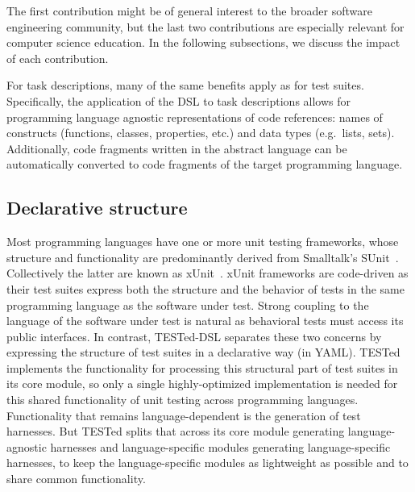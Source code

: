 \documentclass[../main]{subfiles}
\begin{document}
The first contribution might be of general interest to the broader software engineering community, but the last two contributions are especially relevant for computer science education.
In the following subsections, we discuss the impact of each contribution.

For task descriptions, many of the same benefits apply as for test suites.
Specifically, the application of the DSL to task descriptions allows for programming language agnostic representations of code references: names of constructs (functions, classes, properties, etc.) and data types (e.g.\ lists, sets).
Additionally, code fragments written in the abstract language can be automatically converted to code fragments of the target programming language.

\subsection{Declarative structure}\label{subsec:dsl-declarative-structure}

Most programming languages have one or more unit testing frameworks, whose structure and functionality are predominantly derived from Smalltalk's SUnit~\autocite{beckSimpleSmalltalkTesting1997}.
Collectively the latter are known as xUnit~\autocite{meszarosXUnitTestPatterns2007}.
xUnit frameworks are code-driven as their test suites express both the structure and the behavior of tests in the same programming language as the software under test.
Strong coupling to the language of the software under test is natural as behavioral tests must access its public interfaces.
In contrast, TESTed-DSL separates these two concerns by expressing the structure of test suites in a declarative way (in YAML).
TESTed implements the functionality for processing this structural part of test suites in its core module, so only a single highly-optimized implementation is needed for this shared functionality of unit testing across programming languages.
Functionality that remains language-dependent is the generation of test harnesses.
But TESTed splits that across its core module generating language-agnostic harnesses and language-specific modules generating language-specific harnesses, to keep the language-specific modules as lightweight as possible and to share common functionality.
\end{document}
